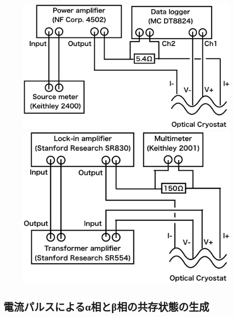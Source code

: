 \begin{figure}[htb]
 \begin{minipage}{\hsize}
    \begin{center}
   \includegraphics[width=0.7\hsize]{experiment/schematics_pulse.eps}
  \end{center}
  \caption{}
  \label{fig:schematics_pulse}
 \end{minipage}
 \begin{minipage}{\hsize}
     \begin{center}
   \includegraphics[width=0.7\hsize]{experiment/schematics_lockin.eps}
  \end{center}
  \caption{}
  \label{fig:schematics_lockin}
   \end{minipage}
\end{figure}

\subsection{電流パルスによるα相とβ相の共存状態の生成}

